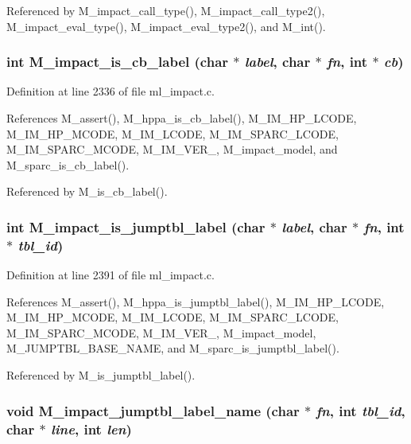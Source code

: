 Referenced by M\_\-impact\_\-call\_\-type(), M\_\-impact\_\-call\_\-type2(), M\_\-impact\_\-eval\_\-type(), M\_\-impact\_\-eval\_\-type2(), and M\_\-int().
\subsubsection{\setlength{\rightskip}{0pt plus 5cm}int M\_\-impact\_\-is\_\-cb\_\-label (char $\ast$ {\em label}, char $\ast$ {\em fn}, int $\ast$ {\em cb})}\label{m__impact_8h_bd0320b0fe8194d89510f78fa77cb3ac}




Definition at line 2336 of file ml\_\-impact.c.

References M\_\-assert(), M\_\-hppa\_\-is\_\-cb\_\-label(), M\_\-IM\_\-HP\_\-LCODE, M\_\-IM\_\-HP\_\-MCODE, M\_\-IM\_\-LCODE, M\_\-IM\_\-SPARC\_\-LCODE, M\_\-IM\_\-SPARC\_\-MCODE, M\_\-IM\_\-VER\_, M\_\-impact\_\-model, and M\_\-sparc\_\-is\_\-cb\_\-label().

Referenced by M\_\-is\_\-cb\_\-label().
\subsubsection{\setlength{\rightskip}{0pt plus 5cm}int M\_\-impact\_\-is\_\-jumptbl\_\-label (char $\ast$ {\em label}, char $\ast$ {\em fn}, int $\ast$ {\em tbl\_\-id})}\label{m__impact_8h_d8c149aca592f99d47dfe571f7ac6900}




Definition at line 2391 of file ml\_\-impact.c.

References M\_\-assert(), M\_\-hppa\_\-is\_\-jumptbl\_\-label(), M\_\-IM\_\-HP\_\-LCODE, M\_\-IM\_\-HP\_\-MCODE, M\_\-IM\_\-LCODE, M\_\-IM\_\-SPARC\_\-LCODE, M\_\-IM\_\-SPARC\_\-MCODE, M\_\-IM\_\-VER\_, M\_\-impact\_\-model, M\_\-JUMPTBL\_\-BASE\_\-NAME, and M\_\-sparc\_\-is\_\-jumptbl\_\-label().

Referenced by M\_\-is\_\-jumptbl\_\-label().
\subsubsection{\setlength{\rightskip}{0pt plus 5cm}void M\_\-impact\_\-jumptbl\_\-label\_\-name (char $\ast$ {\em fn}, int {\em tbl\_\-id}, char $\ast$ {\em line}, int {\em len})}\label{m__impact_8h_0400fcf639590896e30935ad2c9efc13}





